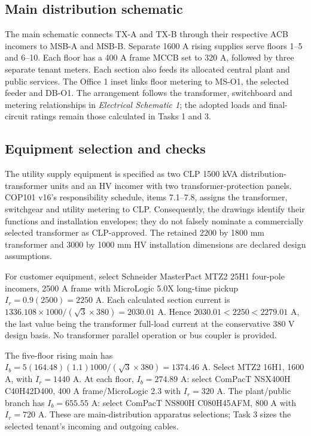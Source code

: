 \subsection*{Main distribution schematic}
The main schematic connects TX-A and TX-B through their respective ACB incomers to MSB-A and MSB-B. Separate 1600 A rising supplies serve floors 1--5 and 6--10. Each floor has a 400 A frame MCCB set to 320 A, followed by three separate tenant meters. Each section also feeds its allocated central plant and public services. The Office 1 inset links floor metering to MS-O1, the selected feeder and DB-O1. The arrangement follows the transformer, switchboard and metering relationships in \emph{Electrical Schematic 1}; the adopted loads and final-circuit ratings remain those calculated in Tasks 1 and 3.

\clearpage
\subsection*{Equipment selection and checks}
The utility supply equipment is specified as two CLP 1500 kVA distribution-transformer units and an HV incomer with two transformer-protection panels. COP101 v16's responsibility schedule, items 7.1--7.8, assigns the transformer, switchgear and utility metering to CLP. Consequently, the drawings identify their functions and installation envelopes; they do not falsely nominate a commercially selected transformer as CLP-approved. The retained 2200 by 1800 mm transformer and 3000 by 1000 mm HV installation dimensions are declared design assumptions.

For customer equipment, select Schneider MasterPact MTZ2 25H1 four-pole incomers, 2500 A frame with MicroLogic 5.0X long-time pickup $I_r=0.9(2500)=2250$ A. Each calculated section current is $1336.108\times1000/(\sqrt3\times380)=2030.01$ A. Hence $2030.01<2250<2279.01$ A, the last value being the transformer full-load current at the conservative 380 V design basis. No transformer parallel operation or bus coupler is provided.

The five-floor rising main has $I_b=5(164.48)(1.1)1000/(\sqrt3\times380)=1374.46$ A. Select MTZ2 16H1, 1600 A, with $I_r=1440$ A. At each floor, $I_b=274.89$ A: select ComPacT NSX400H C40H42D400, 400 A frame/MicroLogic 2.3 with $I_r=320$ A. The plant/public branch has $I_b=655.55$ A: select ComPacT NS800H C080H45AFM, 800 A with $I_r=720$ A. These are main-distribution apparatus selections; Task 3 sizes the selected tenant's incoming and outgoing cables.


